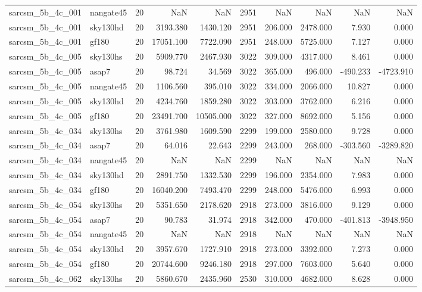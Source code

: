 \begin{longtable}{llrrrrrrrr}
sarcsm\_5b\_4c\_001 & nangate45 & 20 & NaN & NaN & 2951 & NaN & NaN & NaN & NaN \\
sarcsm\_5b\_4c\_001 & sky130hd & 20 & 3193.380 & 1430.120 & 2951 & 206.000 & 2478.000 & 7.930 & 0.000 \\
sarcsm\_5b\_4c\_001 & gf180 & 20 & 17051.100 & 7722.090 & 2951 & 248.000 & 5725.000 & 7.127 & 0.000 \\
sarcsm\_5b\_4c\_005 & sky130hs & 20 & 5909.770 & 2467.930 & 3022 & 309.000 & 4317.000 & 8.461 & 0.000 \\
sarcsm\_5b\_4c\_005 & asap7 & 20 & 98.724 & 34.569 & 3022 & 365.000 & 496.000 & -490.233 & -4723.910 \\
sarcsm\_5b\_4c\_005 & nangate45 & 20 & 1106.560 & 395.010 & 3022 & 334.000 & 2066.000 & 10.827 & 0.000 \\
sarcsm\_5b\_4c\_005 & sky130hd & 20 & 4234.760 & 1859.280 & 3022 & 303.000 & 3762.000 & 6.216 & 0.000 \\
sarcsm\_5b\_4c\_005 & gf180 & 20 & 23491.700 & 10505.000 & 3022 & 327.000 & 8692.000 & 5.156 & 0.000 \\
sarcsm\_5b\_4c\_034 & sky130hs & 20 & 3761.980 & 1609.590 & 2299 & 199.000 & 2580.000 & 9.728 & 0.000 \\
sarcsm\_5b\_4c\_034 & asap7 & 20 & 64.016 & 22.643 & 2299 & 243.000 & 268.000 & -303.560 & -3289.820 \\
sarcsm\_5b\_4c\_034 & nangate45 & 20 & NaN & NaN & 2299 & NaN & NaN & NaN & NaN \\
sarcsm\_5b\_4c\_034 & sky130hd & 20 & 2891.750 & 1332.530 & 2299 & 196.000 & 2354.000 & 7.983 & 0.000 \\
sarcsm\_5b\_4c\_034 & gf180 & 20 & 16040.200 & 7493.470 & 2299 & 248.000 & 5476.000 & 6.993 & 0.000 \\
sarcsm\_5b\_4c\_054 & sky130hs & 20 & 5351.650 & 2178.620 & 2918 & 273.000 & 3816.000 & 9.129 & 0.000 \\
sarcsm\_5b\_4c\_054 & asap7 & 20 & 90.783 & 31.974 & 2918 & 342.000 & 470.000 & -401.813 & -3948.950 \\
sarcsm\_5b\_4c\_054 & nangate45 & 20 & NaN & NaN & 2918 & NaN & NaN & NaN & NaN \\
sarcsm\_5b\_4c\_054 & sky130hd & 20 & 3957.670 & 1727.910 & 2918 & 273.000 & 3392.000 & 7.273 & 0.000 \\
sarcsm\_5b\_4c\_054 & gf180 & 20 & 20744.600 & 9246.180 & 2918 & 297.000 & 7603.000 & 5.640 & 0.000 \\
sarcsm\_5b\_4c\_062 & sky130hs & 20 & 5860.670 & 2435.960 & 2530 & 310.000 & 4682.000 & 8.628 & 0.000 \\

\end{longtable}
